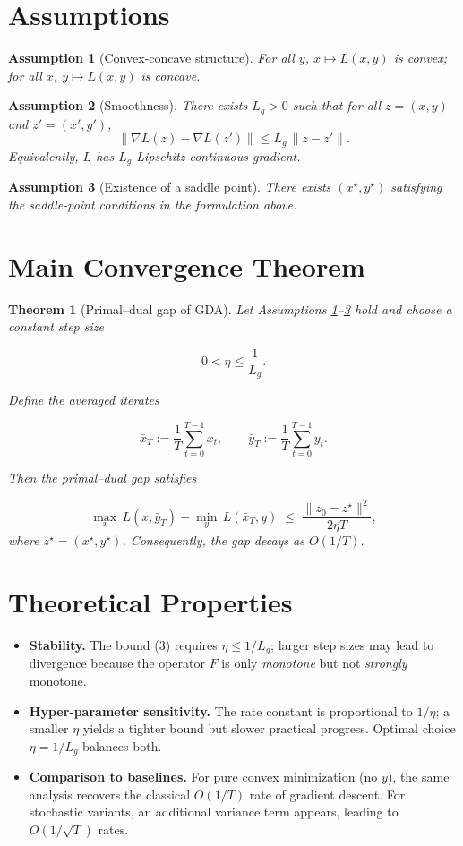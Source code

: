 \documentclass{article}
\newtheorem{theorem}{Theorem}
\newtheorem{assumption}{Assumption}
\begin{document}
\section*{Assumptions}
\begin{assumption}[Convex‑concave structure]\label{ass:convexconcave}
For all $y$, $x\mapsto L(x,y)$ is convex; for all $x$, $y\mapsto L(x,y)$ is concave.
\end{assumption}

\begin{assumption}[Smoothness]\label{ass:smooth}
There exists $L_{g}>0$ such that for all $z=(x,y)$ and $z'=(x',y')$,
\[
\|\nabla L(z)-\nabla L(z')\| \le L_{g}\,\|z-z'\| .
\]
Equivalently, $L$ has $L_{g}$‑Lipschitz continuous gradient.
\end{assumption}

\begin{assumption}[Existence of a saddle point]\label{ass:saddle}
There exists $(x^{\star},y^{\star})$ satisfying the saddle‑point conditions in the formulation above.
\end{assumption}

\section*{Main Convergence Theorem}
\begin{theorem}[Primal–dual gap of GDA]\label{thm:convergence}
Let Assumptions \ref{ass:convexconcave}–\ref{ass:saddle} hold and choose a constant step size  

\[
0<\eta\le\frac{1}{L_{g}}.
\]

Define the averaged iterates  

\[
\bar{x}_{T}:=\frac{1}{T}\sum_{t=0}^{T-1}x_{t},\qquad
\bar{y}_{T}:=\frac{1}{T}\sum_{t=0}^{T-1}y_{t}.
\]

Then the \emph{primal–dual gap} satisfies  

\[
\boxed{
\max_{x}\,L(x,\bar{y}_{T})-\min_{y}\,L(\bar{x}_{T},y)
\;\le\;
\frac{\|z_{0}-z^{\star}\|^{2}}{2\eta T}
},
\tag{3}
\]
where $z^{\star}=(x^{\star},y^{\star})$.
Consequently, the gap decays as $O(1/T)$.
\end{theorem}

\section*{Theoretical Properties}
\begin{itemize}
\item \textbf{Stability.} The bound (3) requires $\eta\le 1/L_{g}$; larger step sizes may lead to divergence because the operator $F$ is only \emph{monotone} but not \emph{strongly} monotone.
\item \textbf{Hyper‑parameter sensitivity.} The rate constant is proportional to $1/\eta$; a smaller $\eta$ yields a tighter bound but slower practical progress. Optimal choice $\eta=1/L_{g}$ balances both.
\item \textbf{Comparison to baselines.} For pure convex minimization (no $y$), the same analysis recovers the classical $O(1/T)$ rate of gradient descent. For stochastic variants, an additional variance term appears, leading to $O(1/\sqrt{T})$ rates.
\end{itemize}
\end{document}
